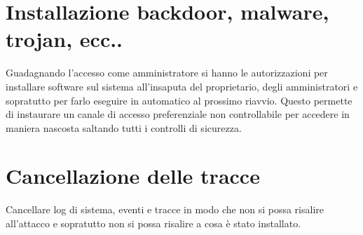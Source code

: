 \documentclass[a4paper,12pt]{article}
\begin{document}
\section{  Installazione backdoor, malware, trojan, ecc..}

Guadagnando l'accesso come amministratore si hanno le autorizzazioni per installare software sul sistema all'insaputa del proprietario, degli amministratori e sopratutto per farlo eseguire in automatico al prossimo riavvio. Questo permette di instaurare un canale di accesso preferenziale non controllabile per accedere in maniera nascosta saltando tutti i controlli di sicurezza. 

\section{  Cancellazione delle tracce}

Cancellare log di sistema, eventi e tracce in modo che non si possa risalire all'attacco e sopratutto non si possa risalire a cosa è stato installato.
\medskip
\end{document}
